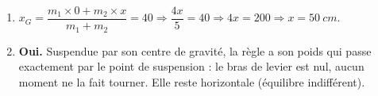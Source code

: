 \documentclass[11pt,a4paper]{article}
\begin{document}
\begin{corrige}
\begin{enumerate}[label=\alph*)]
  \item $x_G = \dfrac{m_1\times 0 + m_2\times x}{m_1+m_2} = 40 \Rightarrow \dfrac{4x}{5}=40
        \Rightarrow 4x = 200 \Rightarrow x = \qty{50}{cm}$.
  \item \textbf{Oui.} Suspendue par son centre de gravité, la règle a son poids qui passe exactement par
        le point de suspension : le bras de levier est nul, aucun moment ne la fait tourner. Elle reste
        horizontale (équilibre indifférent).
\end{enumerate}
\end{corrige}
\end{document}
